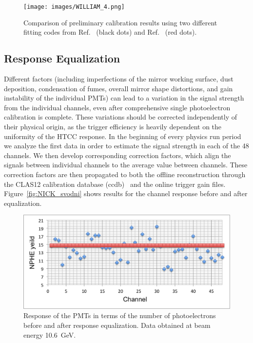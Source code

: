 \begin{figure}[ht]
\centering
\texttt{[image: images/WILLIAM\_4.png]}
\caption{Comparison of preliminary calibration results using two different fitting codes from
  Ref.~\cite{bellamy1996} (black dots) and Ref.~\cite{degtiarenko2017} (red dots).}
\label{fig:WILLIAM_4}
\end{figure}

\subsection{Response Equalization}

Different factors (including imperfections of the mirror working surface, dust deposition, condensation of fumes,
overall mirror shape distortions, and gain instability of the individual PMTs) can lead to a variation in the signal
strength from the individual channels, even after comprehensive single photoelectron calibration is complete.
These variations should be corrected independently of their physical origin, as the trigger efficiency is heavily
dependent on the uniformity of the HTCC response. In the beginning of every physics run period we analyze the
first data in order to estimate the signal strength in each of the 48 channels. We then develop corresponding
correction factors, which align the signals between individual channels to the average value between channels. These
correction factors are then propagated to both the offline reconstruction through the CLAS12 calibration database
(ccdb)~\cite{recon-nim} and the online trigger gain files. Figure~\ref{fig:NICK_svodni} shows results for the
channel response before and after equalization.

\begin{figure}[ht]
\centering
\includegraphics[width=0.99\linewidth]{images/NPHE_GainEq_Mar_12.png}
\caption{Response of the PMTs in terms of the number of photoelectrons before and after response equalization. Data obtained at beam energy 10.6~GeV.}
\label{fig:NPHE_GainEq_Mar_12}
\end{figure}

